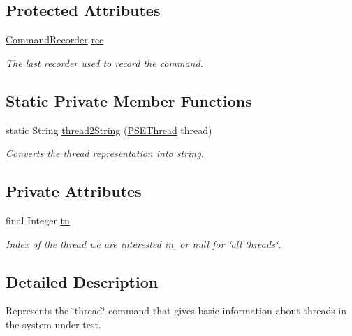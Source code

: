\subsection*{Protected Attributes}
\begin{DoxyCompactItemize}
\item 
\hyperlink{classgov_1_1nasa_1_1jpf_1_1inspector_1_1client_1_1_command_recorder}{Command\+Recorder} \hyperlink{classgov_1_1nasa_1_1jpf_1_1inspector_1_1client_1_1_client_command_af4246f2427035c72a6af45a2c61361f7}{rec}
\begin{DoxyCompactList}\small\item\em The last recorder used to record the command. \end{DoxyCompactList}\end{DoxyCompactItemize}
\subsection*{Static Private Member Functions}
\begin{DoxyCompactItemize}
\item 
static String \hyperlink{classgov_1_1nasa_1_1jpf_1_1inspector_1_1client_1_1commands_1_1_cmd_status_threads_a0f7f7a28275fa7839f26739fd61639c7}{thread2\+String} (\hyperlink{classgov_1_1nasa_1_1jpf_1_1inspector_1_1common_1_1pse_1_1_p_s_e_thread}{P\+S\+E\+Thread} thread)
\begin{DoxyCompactList}\small\item\em Converts the thread representation into string. \end{DoxyCompactList}\end{DoxyCompactItemize}
\subsection*{Private Attributes}
\begin{DoxyCompactItemize}
\item 
final Integer \hyperlink{classgov_1_1nasa_1_1jpf_1_1inspector_1_1client_1_1commands_1_1_cmd_status_threads_afa72fece4b1cb85e254c99e42a8e553f}{tn}
\begin{DoxyCompactList}\small\item\em Index of the thread we are interested in, or null for \char`\"{}all threads\char`\"{}. \end{DoxyCompactList}\end{DoxyCompactItemize}


\subsection{Detailed Description}
Represents the \char`\"{}thread\char`\"{} command that gives basic information about threads in the system under test. 

